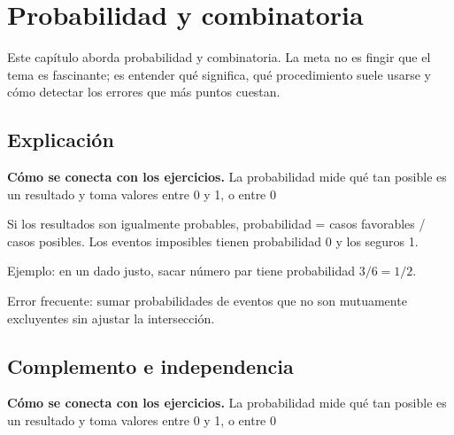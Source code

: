 \documentclass[10pt,oneside,openany]{book}
\begin{document}
\chapter{Probabilidad y combinatoria}

\begin{idea}
Este capítulo aborda probabilidad y combinatoria. La meta no es fingir que el tema es fascinante; es entender qué significa, qué procedimiento suele usarse y cómo detectar los errores que más puntos cuestan.
\end{idea}

\section{Explicación}

\textbf{Cómo se conecta con los ejercicios.} La probabilidad mide qué tan posible es un resultado y toma valores entre 0 y 1, o entre 0 %

Si los resultados son igualmente probables, probabilidad = casos favorables / casos posibles. Los eventos imposibles tienen probabilidad 0 y los seguros 1.



\begin{ejemplo}
Ejemplo: en un dado justo, sacar número par tiene probabilidad $3/6=1/2$.
\end{ejemplo}

\begin{ojo}
Error frecuente: sumar probabilidades de eventos que no son mutuamente excluyentes sin ajustar la intersección.
\end{ojo}



\section{Complemento e independencia}

\textbf{Cómo se conecta con los ejercicios.} La probabilidad mide qué tan posible es un resultado y toma valores entre 0 y 1, o entre 0 %
\end{document}
